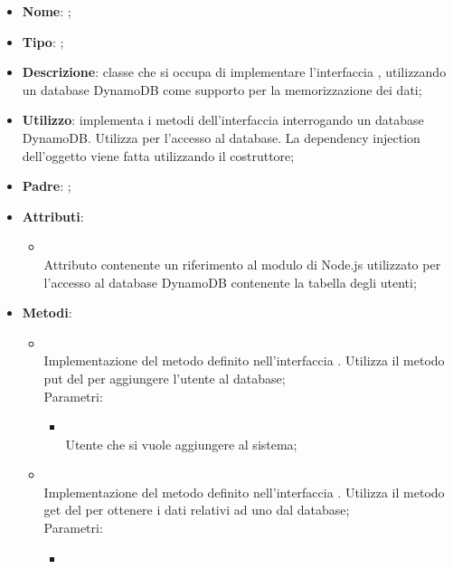 \begin{itemize}
	\item \textbf{Nome}: ;
	\item \textbf{Tipo}: ;
	\item \textbf{Descrizione}: classe che si occupa di implementare l'interfaccia , utilizzando un database DynamoDB come supporto per la memorizzazione dei dati;
	\item \textbf{Utilizzo}: implementa i metodi dell'interfaccia  interrogando un database DynamoDB. Utilizza  per l'accesso al database. La dependency injection dell'oggetto  viene fatta utilizzando il costruttore;
	\item \textbf{Padre}: ;
	\item \textbf{Attributi}:
	\begin{itemize}
		\item[]  \\
		Attributo contenente un riferimento al modulo di Node.js utilizzato per l'accesso al database DynamoDB contenente la tabella degli utenti;
	\end{itemize}
	\item \textbf{Metodi}:
	\begin{itemize}
		\item[]  \\
		Implementazione del metodo definito nell'interfaccia . Utilizza il metodo put del  per aggiungere l'utente al database;\\
		Parametri:
		\begin{itemize}
			\item {} \\
			Utente che si vuole aggiungere al sistema;
		\end{itemize}
		\item[]  \\
		Implementazione del metodo definito nell'interfaccia . Utilizza il metodo get del  per ottenere i dati relativi ad uno  dal database;\\
		Parametri:
		\begin{itemize}
			\item {} \\

\end{itemize}
\end{itemize}
\end{itemize}

